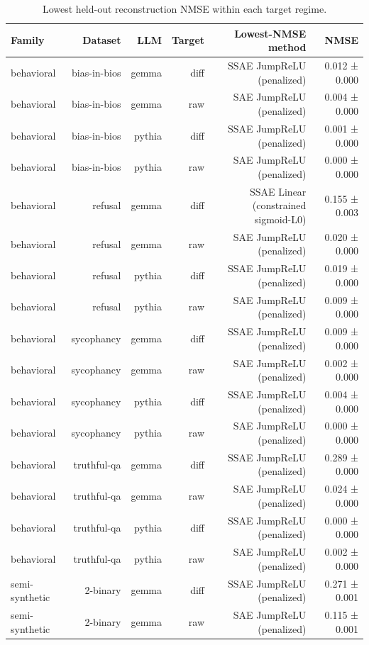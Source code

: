 \begin{table}[t]
\centering
\caption{Lowest held-out reconstruction NMSE within each target regime.}
\label{tab:reconstruction-nmse}
\begin{tabular}{lrrrrr}
\toprule
Family & Dataset & LLM & Target & Lowest-NMSE method & NMSE \\
\midrule
behavioral & bias-in-bios & gemma & diff & SSAE JumpReLU (penalized) & 0.012 ± 0.000 \\
behavioral & bias-in-bios & gemma & raw & SAE JumpReLU (penalized) & 0.004 ± 0.000 \\
behavioral & bias-in-bios & pythia & diff & SSAE JumpReLU (penalized) & 0.001 ± 0.000 \\
behavioral & bias-in-bios & pythia & raw & SAE JumpReLU (penalized) & 0.000 ± 0.000 \\
behavioral & refusal & gemma & diff & SSAE Linear (constrained sigmoid-L0) & 0.155 ± 0.003 \\
behavioral & refusal & gemma & raw & SAE JumpReLU (penalized) & 0.020 ± 0.000 \\
behavioral & refusal & pythia & diff & SSAE JumpReLU (penalized) & 0.019 ± 0.000 \\
behavioral & refusal & pythia & raw & SAE JumpReLU (penalized) & 0.009 ± 0.000 \\
behavioral & sycophancy & gemma & diff & SSAE JumpReLU (penalized) & 0.009 ± 0.000 \\
behavioral & sycophancy & gemma & raw & SAE JumpReLU (penalized) & 0.002 ± 0.000 \\
behavioral & sycophancy & pythia & diff & SSAE JumpReLU (penalized) & 0.004 ± 0.000 \\
behavioral & sycophancy & pythia & raw & SAE JumpReLU (penalized) & 0.000 ± 0.000 \\
behavioral & truthful-qa & gemma & diff & SSAE JumpReLU (penalized) & 0.289 ± 0.000 \\
behavioral & truthful-qa & gemma & raw & SAE JumpReLU (penalized) & 0.024 ± 0.000 \\
behavioral & truthful-qa & pythia & diff & SSAE JumpReLU (penalized) & 0.000 ± 0.000 \\
behavioral & truthful-qa & pythia & raw & SAE JumpReLU (penalized) & 0.002 ± 0.000 \\
semi-synthetic & 2-binary & gemma & diff & SSAE JumpReLU (penalized) & 0.271 ± 0.001 \\
semi-synthetic & 2-binary & gemma & raw & SAE JumpReLU (penalized) & 0.115 ± 0.001 \\

\end{tabular}
\end{table}
